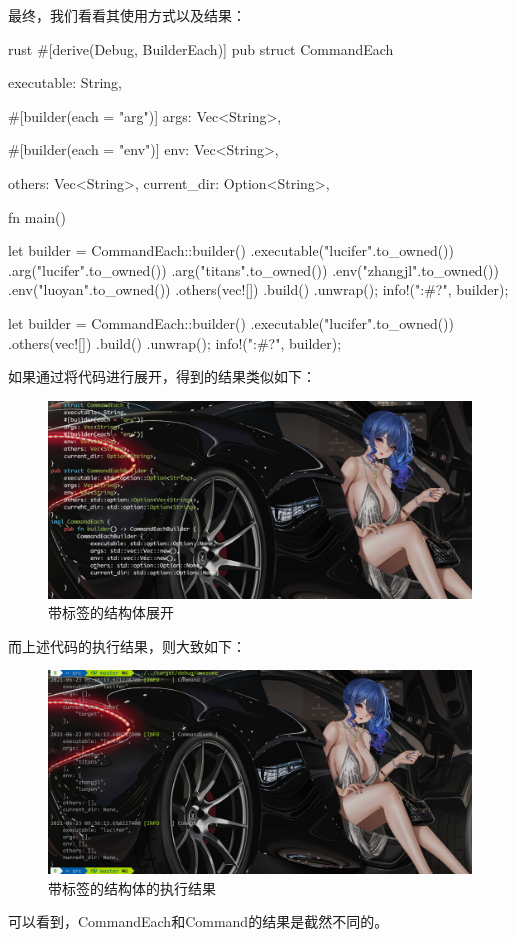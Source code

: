 最终，我们看看其使用方式以及结果：
\begin{code-block}{rust}
#[derive(Debug, BuilderEach)]
pub struct CommandEach {
    executable: String,

    #[builder(each = "arg")]
    args: Vec<String>,

    #[builder(each = "env")]
    env: Vec<String>,

    others: Vec<String>,
    current_dir: Option<String>,
}
fn main() {
    let builder = CommandEach::builder()
        .executable("lucifer".to_owned())
        .arg("lucifer".to_owned())
        .arg("titans".to_owned())
        .env("zhangjl".to_owned())
        .env("luoyan".to_owned())
        .others(vec![])
        .build()
        .unwrap();
    info!("{:#?}", builder);

    let builder = CommandEach::builder()
        .executable("lucifer".to_owned())
        .others(vec![])
        .build()
        .unwrap();
    info!("{:#?}", builder);
}
\end{code-block}

如果通过将代码进行展开，得到的结果类似如下：
\begin{figure}[H]
  \centering
  \includegraphics[width=\linewidth]{rust_label_expand.png}
  \caption{带标签的结构体展开}
  \label{fig:rust_label_expand}
\end{figure}
而上述代码的执行结果，则大致如下：
\begin{figure}[H]
  \centering
  \includegraphics[width=\linewidth]{rust_label_result.png}
  \caption{带标签的结构体的执行结果}
  \label{fig:rust_label_result}
\end{figure}
可以看到，CommandEach和Command的结果是截然不同的。

